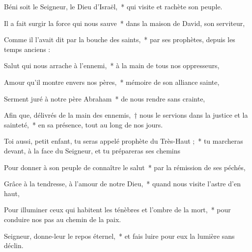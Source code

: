 \item Béni soit le Seigneur, le Dieu d’Israël,~* qui visite et rachète son peuple.

\item Il a fait surgir la force qui nous sauve~* dans la maison de David, son serviteur,

\item Comme il l’avait dit par la bouche des saints,~* par ses prophètes, depuis les temps anciens :

\item Salut qui nous arrache à l’ennemi,~* à la main de tous nos oppresseurs,

\item Amour qu’il montre envers nos pères,~* mémoire de son alliance sainte,

\item Serment juré à notre père Abraham~* de nous rendre sans crainte,

\item Afin que, délivrés de la main des ennemis,~† nous le servions dans la justice et la sainteté,~* en sa présence, tout au long de nos jours.

\item Toi aussi, petit enfant, tu seras appelé prophète du Très-Haut ;~* tu marcheras devant, à la face du Seigneur, et tu prépareras ses chemins

\item Pour donner à son peuple de connaître le salut~* par la rémission de ses péchés,

\item Grâce à la tendresse, à l’amour de notre Dieu,~* quand nous visite l’astre d’en haut,

\item Pour illuminer ceux qui habitent les ténèbres et l’ombre de la mort,~* pour conduire nos pas au chemin de la paix.

\item Seigneur, donne-leur le repos éternel,~* et fais luire pour eux la lumière sans déclin.